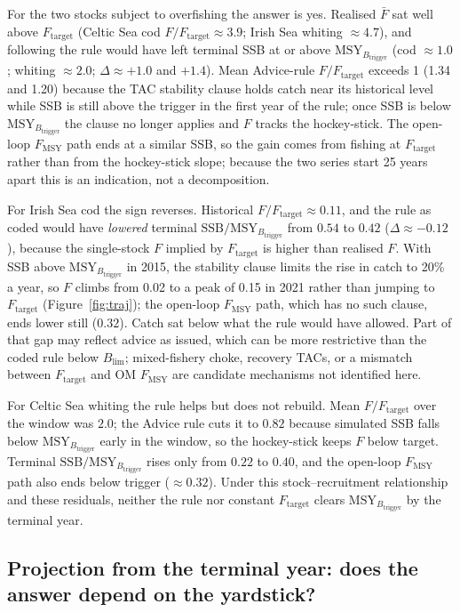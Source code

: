 \documentclass[11pt,a4paper]{article}
\newcommand{\Fmsy}{F_{\mathrm{MSY}}}
\newcommand{\Blim}{B_{\lim}}
\newcommand{\Btrig}{\mathrm{MSY}_{B_{\mathrm{trigger}}}}
\newcommand{\Ftar}{F_{\mathrm{target}}}
\begin{document}
For the two stocks subject to overfishing the answer is yes.
Realised $\bar F$ sat well above $\Ftar$ (Celtic Sea cod $F/\Ftar
\approx 3.9$; Irish Sea whiting $\approx 4.7$), and following the rule
would have left terminal SSB at or above $\Btrig$ (cod $\approx 1.0$;
whiting $\approx 2.0$; $\Delta \approx +1.0$ and $+1.4$). Mean
Advice-rule $F/\Ftar$ exceeds 1 (1.34 and 1.20) because the TAC
stability clause holds catch near its historical level while SSB is
still above the trigger in the first year of the rule; once SSB is
below $\Btrig$ the clause no longer applies and $F$ tracks the
hockey-stick. The open-loop $\Fmsy$ path ends at a similar SSB, so the
gain comes from fishing at $\Ftar$ rather than from the hockey-stick
slope; because the two series start 25 years apart this is an
indication, not a decomposition.

For Irish Sea cod the sign reverses. Historical $F/\Ftar \approx 0.11$,
and the rule as coded would have \emph{lowered} terminal
$\mathrm{SSB}/\Btrig$ from $0.54$ to $0.42$ ($\Delta \approx -0.12$),
because the single-stock $F$ implied by $\Ftar$ is higher than realised
$F$. With SSB above $\Btrig$ in 2015, the stability clause limits the
rise in catch to 20\% a year, so $F$ climbs from 0.02 to a peak of 0.15
in 2021 rather than jumping to $\Ftar$ (Figure~\ref{fig:traj}); the
open-loop $\Fmsy$ path, which has no such clause, ends lower still
($0.32$). Catch sat below what the rule would have allowed. Part of
that gap may reflect advice as issued, which can be more restrictive
than the coded rule below $\Blim$; mixed-fishery choke, recovery TACs,
or a mismatch between $\Ftar$ and OM $\Fmsy$ are candidate mechanisms
not identified here.

For Celtic Sea whiting the rule helps but does not rebuild. Mean
$F/\Ftar$ over the window was $2.0$; the Advice rule cuts it to $0.82$
because simulated SSB falls below $\Btrig$ early in the window, so the
hockey-stick keeps $F$ below target. Terminal $\mathrm{SSB}/\Btrig$
rises only from $0.22$ to $0.40$, and the open-loop $\Fmsy$ path also
ends below trigger ($\approx 0.32$). Under this stock--recruitment
relationship and these residuals, neither the rule nor constant $\Ftar$
clears $\Btrig$ by the terminal year.

\subsection{Projection from the terminal year: does the answer depend on the yardstick?}
\label{sec:res-scoring}
\end{document}
